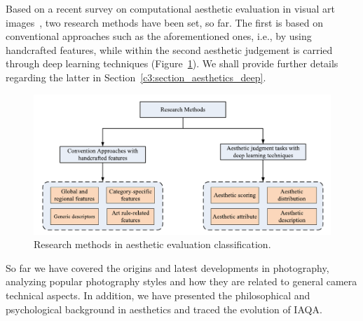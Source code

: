 Based on a recent survey on computational aesthetic evaluation in visual art images~\cite{zhang2021comprehensive}, two research methods have been set, so far.
The first is based on conventional approaches such as the aforementioned ones, i.e., by using handcrafted features, while within the second 
aesthetic judgement is carried through deep learning techniques (Figure~\ref{c2:aesthetics_methods}). We shall provide further details regarding the latter in Section~\ref{c3:section_aesthetics_deep}.


\begin{figure}[h!]
    \centering  
    \includegraphics[width=.6\textwidth]{figures/chap2/aesthetics/methods}
    \caption{Research methods in aesthetic evaluation classification.}
    \label{c2:aesthetics_methods}
\end{figure}

So far we have covered the origins and latest developments in photography, analyzing popular photography styles and how they are related to general camera technical aspects. In addition, we have presented the philosophical and psychological background in aesthetics and traced the evolution of IAQA.

